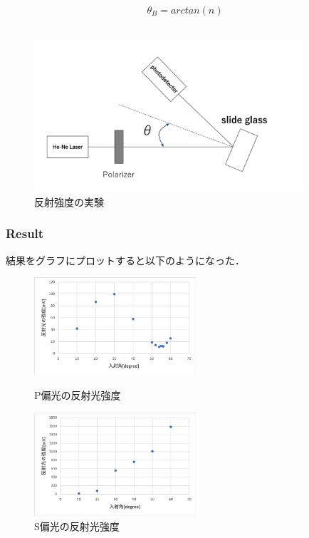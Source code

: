 \documentclass[11pt, a4paper]{jsarticle}
\begin{document}
\begin{equation}
    \theta_B = arctan(n) \label{eq:h}
\end{equation}\\

\begin{figure}[htbp]
 \begin{center}
  \includegraphics[width=100mm]{fig19.png}
 \end{center}
 \caption{反射強度の実験}
 \label{fig:19}
\end{figure}

\subsubsection{Result}
結果をグラフにプロットすると以下のようになった．

\begin{figure}[htbp]
 \begin{minipage}{0.45\hsize}
  \begin{center}
   \includegraphics[width=60mm]{fig20.png}
  \end{center}
  \caption{P偏光の反射光強度}
  \label{fig:20}
 \end{minipage}
 \begin{minipage}{0.45\hsize}
  \begin{center}
   \includegraphics[width=60mm]{fig21.png}
  \end{center}
  \caption{S偏光の反射光強度}
  \label{fig:21}
 \end{minipage}
\end{figure}
\end{document}
